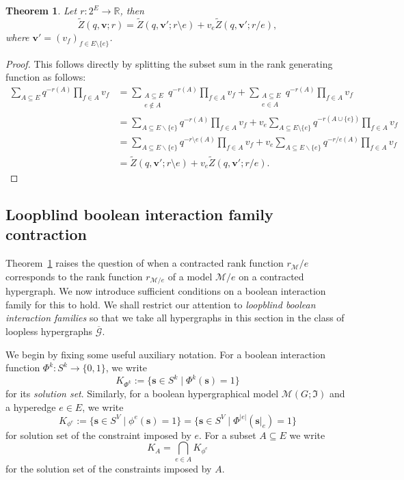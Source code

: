 \documentclass[11pt,reqno]{amsart}
\newcommand{\vecs}{\boldsymbol{s}}
\newcommand{\vecv}{\boldsymbol{v}}
\newcommand{\Mo}{\mathcal{M}}
\newcommand{\IFam}{\mathfrak{I}}
\theoremstyle{plain}
\newtheorem{theorem}{Theorem}[section]
\theoremstyle{definition}
\numberwithin{equation}{section}
\begin{document}
\begin{theorem}
    \label{theo:rankdelcon}
    Let $r \colon 2^E \to \mathbb{R}$, then
    \[
    \widetilde{Z}(q, \vecv; r) =  \widetilde{Z}(q,\vecv';  r\setminus e) + v_e \widetilde{Z}(q, \vecv' ; r/e),
    \]
    where $\vecv' = (v_f)_{f \in E \setminus \{ e\}
    }$.
\end{theorem}
\begin{proof}
    This follows directly by splitting the subset sum in the rank generating function as follows:
    \begin{align*}
        \sum_{A \subseteq E} q^{-r(A)} \prod_{f \in A} v_f &= \sum_{\substack{A \subseteq E \\ e \notin A}}q^{-r(A)} \prod_{f \in A} v_f + \sum_{\substack{A \subseteq E \\ e \in A}}q^{-r(A)} \prod_{f \in A} v_f \\
        &= \sum_{A \subseteq E \backslash \{e\}}q^{-r(A)} \prod_{f \in A} v_f + v_e \sum_{A \subseteq E \setminus \{e\}}q^{-r(A \cup \{e\})} \prod_{f \in A} v_f \\
        &= \sum_{A \subseteq E \backslash \{e \}} q^{- r\setminus e(A)} \prod_{f \in A} v_f + v_e \sum_{A \subseteq E \backslash \{e \}} q^{- r/e(A)} \prod_{f \in A} v_f \\
        &=\widetilde{Z}(q, \vecv';  r\setminus e) + v_e \widetilde{Z}(q, \vecv' ; r/e).
    \end{align*}
\end{proof}


\subsection{Loopblind boolean interaction family contraction}

Theorem~\ref{theo:rankdelcon} raises the question of when a contracted rank function $r_{\Mo} / e$ corresponds to the rank function $r_{\Mo/e}$ of a model $\Mo / e$ on a contracted hypergraph. We now introduce sufficient conditions on a boolean interaction family for this to hold. We shall restrict our attention to \emph{loopblind boolean interaction families} so that we take all hypergraphs in this section in the class of loopless hypergraphs $\overline{\mathcal{G}}$.

We begin by fixing some useful auxiliary notation. For a boolean interaction function $\Phi^k \colon S^k \to \{0,1\}$, we write
\[
    K_{\Phi^k} := \{\vecs \in S^k \mid \Phi^k(\vecs) = 1\}
\]
for its \emph{solution set}. Similarly, for a boolean hypergraphical model $\Mo(G; \IFam)$ and a hyperedge $e \in E$, we write
\[
    K_{\phi^e} := \{\vecs \in S^{V} \mid \phi^e(\vecs) = 1\} = \{\vecs \in S^{V} \mid \Phi^{|e|}(\vecs|_e) = 1\}
\]
for solution set of the constraint imposed by $e$. For a subset $A \subseteq E$ we write
\[
K_A = \bigcap_{e\in A} K_{\phi^e}
\]
for the solution set of the constraints imposed by $A$.
\end{document}
